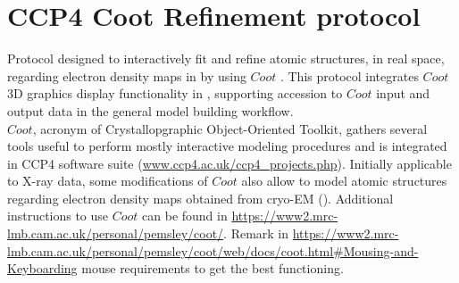 \section{CCP4 Coot Refinement protocol}
\label{app:ccp4CootRefinement}%
Protocol designed to interactively fit and refine atomic structures, in real space, regarding electron density maps in \scipion by using $Coot$ \citep{emsley2010}. This protocol integrates $Coot$ 3D graphics display functionality in \scipion, supporting accession to $Coot$ input and output data in the general model building workflow.\\$Coot$, acronym of Crystallopgraphic Object-Oriented Toolkit, gathers several tools useful to perform mostly interactive modeling procedures and is integrated in CCP4 software suite (\url{www.ccp4.ac.uk/ccp4\_projects.php}). Initially applicable to X-ray data, some modifications of $Coot$ also allow to model atomic structures regarding electron density maps obtained from cryo-EM (\citep{brown2015}). Additional instructions to use $Coot$ can be found in \url{https://www2.mrc-lmb.cam.ac.uk/personal/pemsley/coot/}. Remark in \url{https://www2.mrc-lmb.cam.ac.uk/personal/pemsley/coot/web/docs/coot.html#Mousing-and-Keyboarding} mouse requirements to get the \coot best functioning.\\

